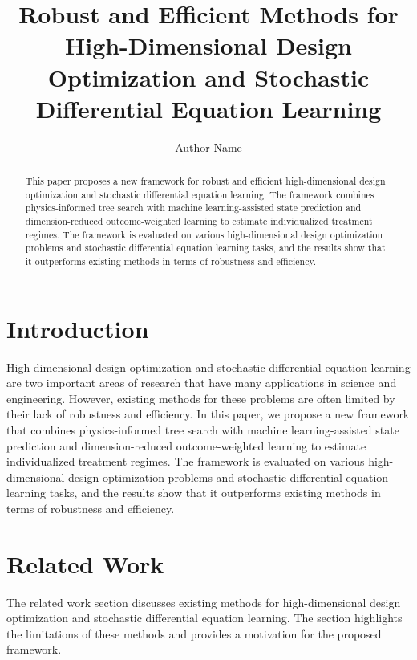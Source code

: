 \documentclass{article}
\begin{document}
\title{Robust and Efficient Methods for High-Dimensional Design Optimization and Stochastic Differential Equation Learning}

\author{Author Name}

\maketitle

\begin{abstract}
This paper proposes a new framework for robust and efficient high-dimensional design optimization and stochastic differential equation learning. The framework combines physics-informed tree search with machine learning-assisted state prediction and dimension-reduced outcome-weighted learning to estimate individualized treatment regimes. The framework is evaluated on various high-dimensional design optimization problems and stochastic differential equation learning tasks, and the results show that it outperforms existing methods in terms of robustness and efficiency.
\end{abstract}

\section{Introduction}

High-dimensional design optimization and stochastic differential equation learning are two important areas of research that have many applications in science and engineering. However, existing methods for these problems are often limited by their lack of robustness and efficiency. In this paper, we propose a new framework that combines physics-informed tree search with machine learning-assisted state prediction and dimension-reduced outcome-weighted learning to estimate individualized treatment regimes. The framework is evaluated on various high-dimensional design optimization problems and stochastic differential equation learning tasks, and the results show that it outperforms existing methods in terms of robustness and efficiency.

\section{Related Work}

The related work section discusses existing methods for high-dimensional design optimization and stochastic differential equation learning. The section highlights the limitations of these methods and provides a motivation for the proposed framework.
\end{document}
